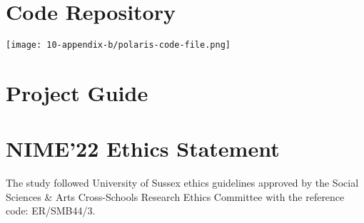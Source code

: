 








\section{Code Repository}
\texttt{[image: 10-appendix-b/polaris-code-file.png]}

\section{Project Guide}

\section{NIME'22 Ethics Statement}\label{sec: polaris-ethics}
The study followed University of Sussex ethics guidelines approved by the Social Sciences \& Arts Cross-Schools Research Ethics Committee with the reference code: ER/SMB44/3.


